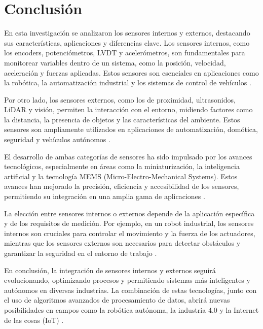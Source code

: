 \section{Conclusión} \label{sec:conclusion}

En esta investigación se analizaron los sensores internos y externos, destacando sus características, aplicaciones y diferencias clave. Los sensores internos, como los encoders, potenciómetros, LVDT y acelerómetros, son fundamentales para monitorear variables dentro de un sistema, como la posición, velocidad, aceleración y fuerzas aplicadas. Estos sensores son esenciales en aplicaciones como la robótica, la automatización industrial y los sistemas de control de vehículos \cite{UAEMex, Acelerometro}.

Por otro lado, los sensores externos, como los de proximidad, ultrasonidos, LiDAR y visión, permiten la interacción con el entorno, midiendo factores como la distancia, la presencia de objetos y las características del ambiente. Estos sensores son ampliamente utilizados en aplicaciones de automatización, domótica, seguridad y vehículos autónomos \cite{Proximidad, Ultrasonicos, LIDAR}.

El desarrollo de ambas categorías de sensores ha sido impulsado por los avances tecnológicos, especialmente en áreas como la miniaturización, la inteligencia artificial y la tecnología MEMS (Micro-Electro-Mechanical Systems). Estos avances han mejorado la precisión, eficiencia y accesibilidad de los sensores, permitiendo su integración en una amplia gama de aplicaciones \cite{MEMS}.

La elección entre sensores internos o externos depende de la aplicación específica y de los requisitos de medición. Por ejemplo, en un robot industrial, los sensores internos son cruciales para controlar el movimiento y la fuerza de los actuadores, mientras que los sensores externos son necesarios para detectar obstáculos y garantizar la seguridad en el entorno de trabajo \cite{Resolver, Proximidad}.

En conclusión, la integración de sensores internos y externos seguirá evolucionando, optimizando procesos y permitiendo sistemas más inteligentes y autónomos en diversas industrias. La combinación de estas tecnologías, junto con el uso de algoritmos avanzados de procesamiento de datos, abrirá nuevas posibilidades en campos como la robótica autónoma, la industria 4.0 y la Internet de las cosas (IoT) \cite{LIDAR, Vision}.




